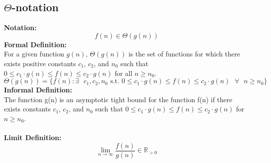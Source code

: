 \subsection{$\Theta$-notation}
\textbf{Notation:}\\
$$
f(n) \in \Theta(g(n))
$$
\textbf{Formal Definition:}\\
For a given function $g(n)$, $\Theta(g(n))$ is the set of functions for which there exists positive constants $c_1$, $c_2$, and $n_0$ such that $0 \leq c_1 \cdot g(n) \leq f(n) \leq c_2 \cdot g(n)$ for all $n \geq n_0$.
$$
\Theta(g(n)) = \{ f(n) : \exists \text{ } c_1, c_2, n_0 \text{ s.t. } 0 \leq c_1 \cdot g(n) \leq f(n) \leq c_2 \cdot g(n) \text{ } \forall \text{ } n \geq n_0 \}
$$
\textbf{Informal Definition:}\\
The function g(n) is an asymptotic tight bound for the function f(n) if there exists constants $c_1$, $c_2$, and $n_0$ such that $0 \leq c_1 \cdot g(n) \leq f(n) \leq c_2 \cdot g(n)$ for $n \geq n_0$.\\\\
\textbf{Limit Definition:}\\
$$
\lim\limits_{n\to\infty} \frac{f(n)}{g(n)} \in \mathbb{R}_{>0}
$$